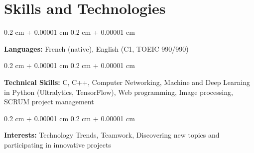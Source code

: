 \documentclass[10pt, letterpaper]{article}
\newenvironment{onecolentry}{
    \begin{adjustwidth}{
        0.2 cm + 0.00001 cm
    }{
        0.2 cm + 0.00001 cm
    }
}{
    \end{adjustwidth}
} %
\begin{document}
    \section{Skills and Technologies}
        \begin{onecolentry}
            \textbf{Languages:} French (native), English (C1, TOEIC 990/990) 
        \end{onecolentry}

        \begin{onecolentry}
            \textbf{Technical Skills:} C, C++, Computer Networking, Machine and Deep Learning in Python (Ultralytics, TensorFlow), Web programming, Image processing, SCRUM project management
        \end{onecolentry}

        \begin{onecolentry}
            \textbf{Interests:} Technology Trends, Teamwork, Discovering new topics and participating in innovative projects
        \end{onecolentry}
\end{document}
